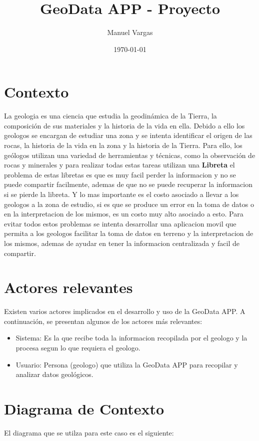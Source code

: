 \documentclass[a4paper,12pt]{article}
\title{GeoData APP - Proyecto}
\author{Manuel Vargas}
\date{\today}
\begin{document}
\maketitle

\section{Contexto}
La geologia es una ciencia que estudia la geodinámica de la Tierra, la composición de sus materiales y la historia de la vida en ella. Debido a ello los geologos se encargan de estudiar una zona y se intenta identificar el origen de las rocas, la historia de la vida en la zona y la historia de la Tierra. Para ello, los geólogos utilizan una variedad de herramientas y técnicas, como la observación de rocas y minerales y para realizar todas estas tareas utilizan una \textbf{Libreta} el problema de estas libretas es que es muy facil perder la informacion y no se puede compartir facilmente, ademas de que no se puede recuperar la informacion si se pierde la libreta. Y lo mas importante es el costo asociado a llevar a los geologos a la zona de estudio, si es que se produce un error en la toma de datos o en la interpretacion de los mismos, es un costo muy alto asociado a esto. Para evitar todos estos problemas se intenta desarrollar una aplicacion movil que permita a los geologos facilitar la toma de datos en terreno y la interpretacion de los mismos, ademas de ayudar en tener la informacion centralizada y facil de compartir.
\section{Actores relevantes}
Existen varios actores implicados en el desarrollo y uso de la GeoData APP. A continuación, se presentan algunos de los actores más relevantes:
\begin{itemize}
    \item Sistema: Es la que recibe toda la informacion recopilada por el geologo y la procesa segun lo que requiera el geologo.
    \item Usuario: Persona (geologo) que utiliza la GeoData APP para recopilar y analizar datos geológicos.
\end{itemize}

\section{Diagrama de Contexto}
El diagrama que se utilza para este caso es el siguiente:
\end{document}
